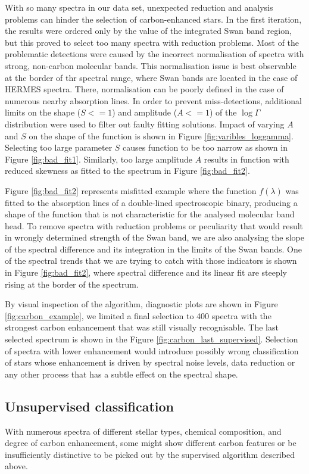 With so many spectra in our data set, unexpected reduction and analysis problems can hinder the selection of carbon-enhanced stars. In the first iteration, the results were ordered only by the value of the integrated Swan band region, but this proved to select too many spectra with reduction problems. Most of the problematic detections were caused by the incorrect normalisation of spectra with strong, non-carbon molecular bands. This normalisation issue is best observable at the border of thr spectral range, where Swan bands are located in the case of HERMES spectra. There, normalisation can be poorly defined in the case of numerous nearby absorption lines. In order to prevent miss-detections, additional limits on the shape ($S <= 1$) and amplitude ($A <= 1$) of the $\log{}\Gamma$ distribution were used to filter out faulty fitting solutions. Impact of varying $A$ and $S$ on the shape of the function is shown in Figure \ref{fig:varibles_loggamma}. Selecting too large parameter $S$ causes function to be too narrow as shown in Figure \ref{fig:bad_fit1}. Similarly, too large amplitude $A$ results in function with reduced skewness as fitted to the spectrum in Figure \ref{fig:bad_fit2}. 

Figure \ref{fig:bad_fit2} represents misfitted example where the function $f(\lambda)$ was fitted to the absorption lines of a double-lined spectroscopic binary, producing a shape of the function that is not characteristic for the analysed molecular band head. To remove spectra with reduction problems or peculiarity that would result in wrongly determined strength of the Swan band, we are also analysing the slope of the spectral difference and its integration in the limits of the Swan bands. One of the spectral trends that we are trying to catch with those indicators is shown in Figure \ref{fig:bad_fit2}, where spectral difference and its linear fit are steeply rising at the border of the spectrum.

By visual inspection of the algorithm, diagnostic plots are shown in Figure \ref{fig:carbon_example}, we limited a final selection to 400 spectra with the strongest carbon enhancement that was still visually recognisable. The last selected spectrum is shown in the Figure \ref{fig:carbon_last_supervised}. Selection of spectra with lower enhancement would introduce possibly wrong classification of stars whose enhancement is driven by spectral noise levels, data reduction or any other process that has a subtle effect on the spectral shape.

\subsection{Unsupervised classification}
\label{sec:unsupervised}
With numerous spectra of different stellar types, chemical composition, and degree of carbon enhancement, some might show different carbon features or be insufficiently distinctive to be picked out by the supervised algorithm described above.

